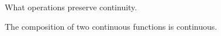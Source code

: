 
\sbasic



\sstart



What operations preserve continuity.


\begin{prop}
The composition of two continuous
functions is continuous.
\end{prop}

\strats
